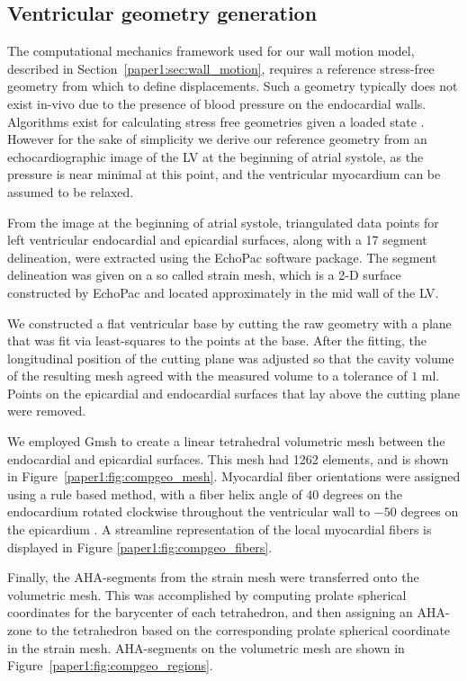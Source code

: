 \subsection{Ventricular geometry generation}
\label{paper1:sec:compgeo}
The computational mechanics framework used for our wall motion model,
described in Section~\ref{paper1:sec:wall_motion}, requires a reference stress-free geometry from
which to define displacements. Such a geometry typically does not exist in-vivo due to the 
presence of blood pressure on the endocardial walls. Algorithms exist for calculating
stress free geometries given a loaded state \cite{bols2013computational, gee2010computational}.
However for the sake of simplicity we derive our reference geometry from an echocardiographic
image of the LV at the beginning of atrial systole,
as the pressure is near minimal at this point, and the ventricular myocardium
can be assumed to be relaxed.

From the image at the beginning of atrial systole, triangulated data points
for left ventricular endocardial and epicardial surfaces, along with a 17 segment delineation,
were extracted using the EchoPac software package.
The segment delineation was given on a so called strain mesh, which is a 2-D surface constructed by
EchoPac and located approximately in the mid wall of the LV.


We constructed a flat ventricular base by cutting the raw geometry
with a plane that was fit via least-squares to the points at the base.
After the fitting, the longitudinal position of the cutting plane was
adjusted so that the cavity volume of the resulting mesh agreed with
the measured volume to a tolerance of $1$ ml. Points on the epicardial
and endocardial surfaces that lay above the cutting plane were removed. 

We employed Gmsh \cite{geuzaine2009gmsh} to create a 
linear tetrahedral volumetric mesh between the endocardial and epicardial surfaces. 
This mesh had 1262 elements, and is shown in Figure~\ref{paper1:fig:compgeo_mesh}.
Myocardial fiber orientations were assigned using a rule based method,
with a fiber helix angle of $40$ degrees on the 
endocardium rotated clockwise throughout the ventricular wall 
to $-50$ degrees on the epicardium \cite{bayer2012novel}. 
A streamline representation of the local myocardial fibers is displayed
in Figure \ref{paper1:fig:compgeo_fibers}.

Finally, the AHA-segments from the strain mesh were transferred onto the volumetric mesh.
This was accomplished by computing prolate spherical coordinates for
the barycenter of each tetrahedron,
and then assigning an AHA-zone to the tetrahedron 
based on the corresponding prolate spherical coordinate in the strain mesh. 
AHA-segments on the volumetric mesh are shown in Figure~\ref{paper1:fig:compgeo_regions}.


